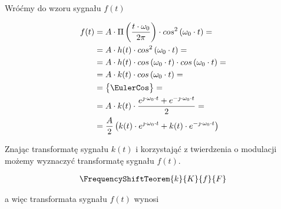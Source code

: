 \begin{task}
Wróćmy do wzoru sygnału $f(t)$

\begin{align*}
f(t) &= A\cdot \Pi\left(\frac{t \cdot \omega_0}{2\pi}\right) \cdot cos^2\left(\omega_0 \cdot t\right) = \\
&= A\cdot h(t) \cdot cos^2\left(\omega_0 \cdot t\right) = \\
&= A\cdot h(t) \cdot cos\left(\omega_0 \cdot t\right) \cdot cos\left(\omega_0 \cdot t\right) = \\
&= A\cdot k(t) \cdot cos\left(\omega_0 \cdot t\right) = \\
&=\begin{Bmatrix}
\EulerCos
\end{Bmatrix}=\\
& = A\cdot k(t) \cdot \frac{e^{\jmath \cdot \omega_0 \cdot t} + e^{-\jmath \cdot \omega_0 \cdot t}}{2} = \\
& = \frac{A}{2} \left( k(t) \cdot e^{\jmath \cdot \omega_0 \cdot t} + k(t) \cdot e^{-\jmath \cdot \omega_0 \cdot t} \right)
\end{align*}

Znając transformatę sygnału $k(t)$ i korzystająć z twierdzenia o modulacji możemy wyznaczyć transformatę sygnału $f(t)$.

\begin{align*}
\FrequencyShiftTeorem{k}{K}{f}{F}
\end{align*}

a więc transformata sygnału $f(t)$ wynosi


\end{task}
